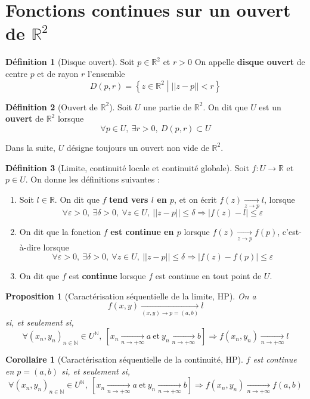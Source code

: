 \documentclass[french]{book}
\newcommand{\N}{\mathbb{N}}
\newcommand{\R}{\mathbb{R}}
\newcommand{\tq}{\middle|}
\theoremstyle{plain}
\newtheorem{prop}{Proposition}[chapter]
\newtheorem{cor}{Corollaire}[chapter]
\theoremstyle{definition}
\newtheorem{dfn}{Définition}[chapter]
\theoremstyle{remark}
\begin{document}
\section{Fonctions continues sur un ouvert de $\R^2$}
\begin{dfn}[Disque ouvert]
	Soit $p\in\R^2$ et $r>0$ On appelle \textbf{disque ouvert} de centre $p$ et de rayon $r$ l'ensemble $$D(p,r)=\left\{z\in\R^2 \tq ||z-p||<r\right\}$$
\end{dfn}
\begin{dfn}[Ouvert de $\R^2$]
	Soit $U$ une partie de $\R^2$. On dit que $U$ est un \textbf{ouvert} de $\R^2$ lorsque $$\forall p \in U, \ \exists r>0, \ D(p,r) \subset U$$
\end{dfn}
Dans la suite, $U$ désigne toujours un ouvert non vide de $\R^2$.
\begin{dfn}[Limite, continuité locale et continuité globale]
	Soit $f:U\rightarrow\R$ et $p\in U$. On donne les définitions suivantes : \begin{enumerate}
		\item Soit $l\in\R$. On dit que $f$ \textbf{tend vers $l$ en $p$}, et on écrit $f(z) \xrightarrow[z\to p]{}l$, lorsque $$\forall \varepsilon>0, \ \exists\delta>0, \ \forall z \in U, \ ||z-p||\leqslant \delta \Longrightarrow|f(z)-l|\leqslant\varepsilon$$
		\item On dit que la fonction $f$ \textbf{est continue en $p$} lorsque $f(z) \xrightarrow[z\to p]{}f(p)$, c'est-à-dire lorsque $$\forall \varepsilon>0, \ \exists\delta>0, \ \forall z \in U, \ ||z-p||\leqslant \delta \Longrightarrow|f(z)-f(p)|\leqslant\varepsilon$$
		\item On dit que $f$ est \textbf{continue} lorsque $f$ est continue en tout point de $U$.
	\end{enumerate}
\end{dfn}
\begin{prop}[Caractérisation séquentielle de la limite, HP]
	On a $$f(x,y)\xrightarrow[(x,y)\to p=(a,b)]{}l$$ si, et seulement si, $$\forall(x_n,y_n)_{n\in\N}\in U^\N, \ \left[x_n\xrightarrow[n\to+\infty]{}a \ \text{et} \ y_n\xrightarrow[n\to+\infty]{}b \right] \Longrightarrow f(x_n,y_n)\xrightarrow[n\to+\infty]{}l$$
\end{prop}
\begin{cor}[Caractérisation séquentielle de la continuité, HP]
	$f$ est continue en $p=(a,b)$ si, et seulement si, $$\forall(x_n,y_n)_{n\in\N}\in U^\N, \ \left[x_n\xrightarrow[n\to+\infty]{}a \ \text{et} \ y_n\xrightarrow[n\to+\infty]{}b \right] \Longrightarrow f(x_n,y_n)\xrightarrow[n\to+\infty]{}f(a,b)$$
\end{cor}
\end{document}
